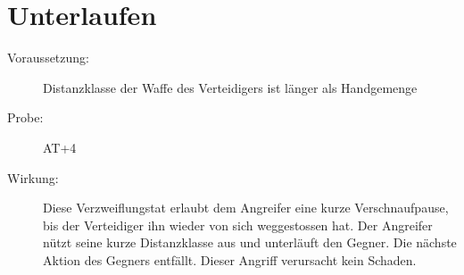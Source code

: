 \section{Unterlaufen}
\label{uAT.unterlaufen}
\begin{description}
    \item[Voraussetzung:]
        Distanzklasse der Waffe des Verteidigers ist länger als Handgemenge
    \item[Probe:]
        AT+4
    \item[Wirkung:]
        Diese Verzweiflungstat erlaubt dem Angreifer eine kurze Verschnaufpause, bis der Verteidiger ihn wieder von sich weggestossen hat.
        Der Angreifer nützt seine kurze Distanzklasse aus und unterläuft den Gegner.
        Die nächste Aktion des Gegners entfällt. Dieser Angriff verursacht kein Schaden.
\end{description}
